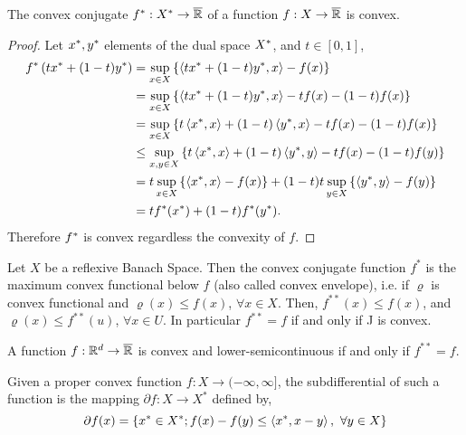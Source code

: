 \begin{proposition}
	The convex conjugate ${f}^*:{X}^*\rightarrow \overline{\mathbb{R}}$ of a function $f:X\rightarrow\overline{\mathbb{R}}$ is convex.
	\begin{proof}
		Let ${x}^*, {y}^*$ elements of the dual space ${X}^*$, and $t\in[0,1]$,
		\begin{align*}
			{f}^*\left( t{x}^*+(1-t){y}^* \right)&=\sup_{x\in X}\left\lbrace \left\langle t{x}^*+(1-t){y}^*, x \right\rangle-f(x) \right\rbrace \\
			&=\sup_{x\in X}\left\lbrace \left\langle t{x}^*+(1-t){y}^*, x \right\rangle-tf(x)-(1-t)f(x) \right\rbrace\\
			&=\sup_{x\in X}\left\lbrace t\left\langle {x}^*, x \right\rangle+(1-t)\left\langle {y}^*, x \right\rangle-tf(x)-(1-t)f(x) \right\rbrace\\
			&\leq \sup_{x, y \in X} \left\lbrace t\left\langle {x}^*, x \right\rangle+(1-t)\left\langle {y}^*, y \right\rangle-tf(x)-(1-t)f(y) \right\rbrace\\
			&=t\sup_{x \in X} \left\lbrace \left\langle {x}^*, x \right\rangle-f(x) \right\rbrace+(1-t)t\sup_{y \in X} \left\lbrace \left\langle {y}^*, y \right\rangle-f(y) \right\rbrace\\
			&=t{f}^*({x}^*)+(1-t){f}^*({y}^*).
		\end{align*}
		Therefore ${f}^*$ is convex regardless the convexity of $f$.
	\end{proof}
\end{proposition}


	
\begin{theorem}
	Let $X$ be a reflexive Banach Space. Then the convex conjugate function $f^*$ is the maximum convex functional below $f$ (also called convex envelope), i.e. if $\varrho$ is convex functional and $\varrho(x)\leq f(x)$, $\forall x \in X$. Then, $f^{**}(x)\leq f(x)$, and $\varrho(x)\leq f^{**}(u)$, $\forall x \in U $. In particular $f^{**} = f$ if and only if J is convex.
\end{theorem}

\begin{corollary} 
	A function $f:\mathbb{R}^d \rightarrow \overline{\mathbb{R}}$ is convex and lower-semicontinuous if and only if $f^{**}=f$.
\end{corollary}

\begin{definition}[Subdifferential]
	Given a proper convex function $f: X\rightarrow (-\infty, \infty]$, the subdifferential of such a function is the mapping $\partial f: X\rightarrow X^*$ defined by,
	\begin{equation*}
		\partial f (x)= \left\lbrace x^*\in X^*; f(x)-f(y) \leq \left\langle x^*, x-y \right\rangle,\ \forall y \in X \right\rbrace
	\end{equation*}
\end{definition}

